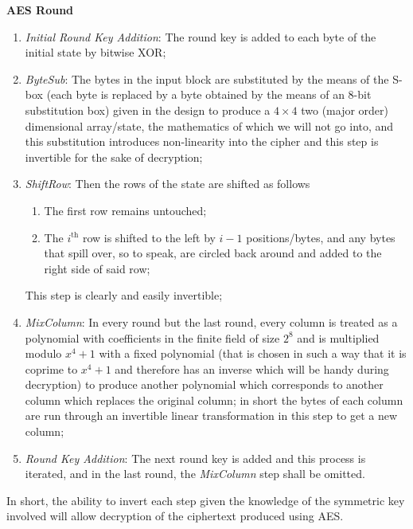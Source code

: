 \begin{center}
    \textbf{AES Round}
\end{center}

\begin{enumerate}
    \item \emph{Initial Round Key Addition}: The round key is added to each byte of the initial state by bitwise XOR;
    \item \emph{ByteSub}: The bytes in the input block are substituted by the means of the S-box (each byte is replaced by a byte obtained by the means of an $8$-bit substitution box) given in the design to produce a $4\times 4$ two (major order) dimensional array/state, the mathematics of which we will not go into, and this substitution introduces non-linearity into the cipher and this step is invertible for the sake of decryption;
    \item \emph{ShiftRow}: Then the rows of the state are shifted as follows

    \begin{enumerate}
        \item The first row remains untouched;
        \item The $i^\text{th}$ row is shifted to the left by $i-1$ positions/bytes, and any bytes that spill over, so to speak, are circled back around and added to the right side of said row;
    \end{enumerate}

    This step is clearly and easily invertible;
\item \emph{MixColumn}: In every round but the last round, every column is treated as a polynomial with coefficients in the finite field of size $2^8$ and is multiplied modulo $x^4+1$ with a fixed polynomial (that is chosen in such a way that it is coprime to $x^4+1$ and therefore has an inverse which will be handy during decryption) to produce another polynomial which corresponds to another column which replaces the original column; 
    in short the bytes of each column are run through an invertible linear transformation in this step to get a new column;
\item \emph{Round Key Addition}: The next round key is added and this process is iterated, and in the last round, the \emph{MixColumn} step shall be omitted.
\end{enumerate}

In short, the ability to invert each step given the knowledge of the symmetric key involved will allow decryption of the ciphertext produced using AES.

